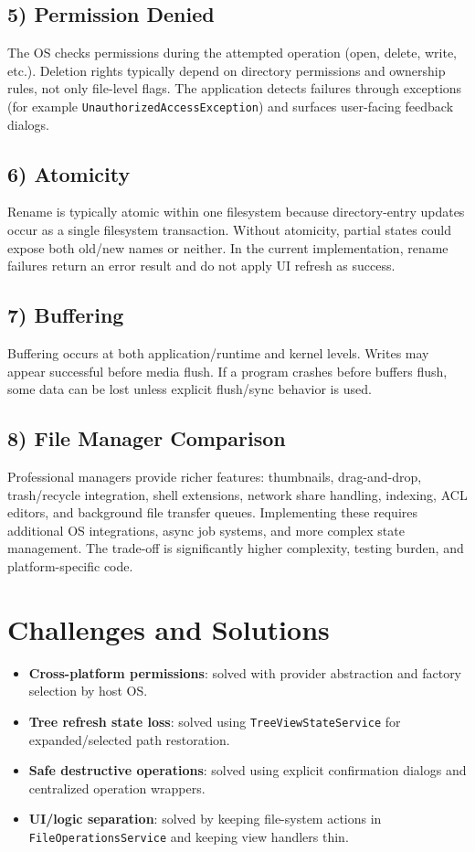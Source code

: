 \documentclass[11pt]{article}
\begin{document}
\subsection*{5) Permission Denied}
The OS checks permissions during the attempted operation (open, delete, write, etc.). Deletion rights typically depend on directory permissions and ownership rules, not only file-level flags. The application detects failures through exceptions (for example \texttt{UnauthorizedAccessException}) and surfaces user-facing feedback dialogs.

\subsection*{6) Atomicity}
Rename is typically atomic within one filesystem because directory-entry updates occur as a single filesystem transaction. Without atomicity, partial states could expose both old/new names or neither. In the current implementation, rename failures return an error result and do not apply UI refresh as success.

\subsection*{7) Buffering}
Buffering occurs at both application/runtime and kernel levels. Writes may appear successful before media flush. If a program crashes before buffers flush, some data can be lost unless explicit flush/sync behavior is used.

\subsection*{8) File Manager Comparison}
Professional managers provide richer features: thumbnails, drag-and-drop, trash/recycle integration, shell extensions, network share handling, indexing, ACL editors, and background file transfer queues. Implementing these requires additional OS integrations, async job systems, and more complex state management. The trade-off is significantly higher complexity, testing burden, and platform-specific code.

\section{Challenges and Solutions}
\begin{itemize}
  \item \textbf{Cross-platform permissions}: solved with provider abstraction and factory selection by host OS.
  \item \textbf{Tree refresh state loss}: solved using \texttt{TreeViewStateService} for expanded/selected path restoration.
  \item \textbf{Safe destructive operations}: solved using explicit confirmation dialogs and centralized operation wrappers.
  \item \textbf{UI/logic separation}: solved by keeping file-system actions in \texttt{FileOperationsService} and keeping view handlers thin.
\end{itemize}
\end{document}
